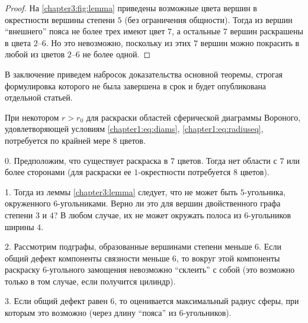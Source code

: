 \begin{proof}
На \figurename{ \ref{chapter3:fig:lemma}} приведены возможные цвета вершин в окрестности вершины степени $5$ (без ограничения общности). 
Тогда из вершин \enquote{внешнего} пояса не более трех имеют цвет $7$, а остальные $7$ вершин раскрашены в цвета $2$--$6$. Но это невозможно, поскольку из этих $7$ вершин можно покрасить в любой из цветов $2$--$6$ не более одной. 
\end{proof}

В заключение приведем набросок доказательства основной теоремы, 
строгая формулировка которого не была завершена в срок и будет опубликована отдельной статьей.

\begin{theorem}
При некотором $r>r_0$ для раскраски областей сферической диаграммы Вороного,
удовлетворяющей условиям \ref{chapter1:eq:diams}, \ref{chapter1:eq:radiuseq}, 
потребуется по крайней мере $8$ цветов.
\end{theorem}

\begin{myproof}
0. Предположим, что существует раскраска в $7$ цветов. Тогда нет области с $7$ или более сторонами (для раскраски ее $1$-окрестности потребуется $8$ цветов).

1. Тогда из леммы \ref{chapter3:lemma} следует, что не может быть $5$-угольника, окруженного $6$-угольниками. Верно ли это для вершин двойственного графа степени $3$ и $4$? В любом случае, их не может окружать полоса из $6$-угольников ширины $4$.

2. Рассмотрим подграфы, образованные вершинами степени меньше $6$. Если общий дефект компоненты связности меньше $6$, то вокруг этой компоненты раскраску $6$-угольного замощения невозможно \enquote{склеить} с собой (это возможно только в том случае, если получится цилиндр).

3. Если общий дефект равен $6$, то оценивается максимальный радиус сферы, при которым это возможно (через длину \enquote{пояса} из $6$-угольников).
\end{myproof}